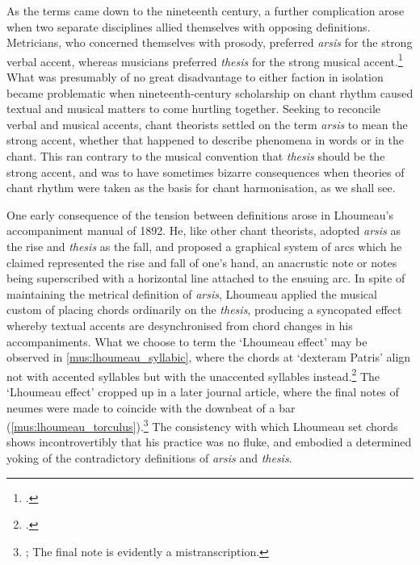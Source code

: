As the terms came down to the nineteenth century, a further complication arose when two separate disciplines allied themselves with opposing definitions.
Metricians, who concerned themselves with prosody, preferred \emph{arsis} for the strong verbal accent, whereas musicians preferred \emph{thesis} for the strong musical accent.\footcites[44]{RiemannMusikLexikon1882}[34--5]{RiemannArsis1899}
What was presumably of no great disadvantage to either faction in isolation became problematic when nineteenth-century scholarship on chant rhythm caused textual and musical matters to come hurtling together.
Seeking to reconcile verbal and musical accents, chant theorists settled on the term \emph{arsis} to mean the strong accent, whether that happened to describe phenomena in words or in the chant.
This ran contrary to the musical convention that \emph{thesis} should be the strong accent, and was to have sometimes bizarre consequences when theories of chant rhythm were taken as the basis for chant harmonisation, as we shall see.

\label{hl:lhoumeau_1892}%
One early consequence of the tension between definitions arose in Lhoumeau's accompaniment manual of 1892.
He, like other chant theorists, adopted \emph{arsis} as the rise and \emph{thesis} as the fall, and proposed a graphical system of arcs which he claimed represented the rise and fall of one's hand, an anacrustic note or notes being superscribed with a horizontal line attached to the ensuing arc.
In spite of maintaining the metrical definition of \emph{arsis}, Lhoumeau applied the musical custom of placing chords ordinarily on the \emph{thesis}, producing a syncopated effect whereby textual accents are desynchronised from chord changes in his accompaniments.
What we choose to term the `Lhoumeau effect' may be observed in \cref{mus:lhoumeau_syllabic}, where the chords at `dexteram Patris' align not with accented syllables but with the unaccented syllables instead.\footcite[pp.~5, 13, 240, 245, 329]{LhoumeauRhythmeexecutionaccompagnement1892}
%
The `Lhoumeau effect' cropped up in a later journal article, where the final notes of neumes were made to coincide with the downbeat of a bar (\cref{mus:lhoumeau_torculus}).\footnote{\cite[140]{Lhoumeauaccordpourchaque1893}; The final note is evidently a mistranscription.}
The consistency with which Lhoumeau set chords shows incontrovertibly that his practice was no fluke, and embodied a determined yoking of the contradictory definitions of \emph{arsis} and \emph{thesis}.
\noclub[2]

